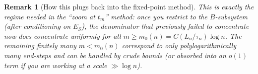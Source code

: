 \documentclass[11pt]{article}
\newtheorem{rmk}{Remark}
\begin{document}
\begin{rmk}[How this plugs back into the fixed-point method]
This is exactly the regime needed in the ``zoom at $t_m$'' method:
once you restrict to the $B$-subsystem (after conditioning on $E_S$), the denominator
that previously failed to concentrate now does concentrate uniformly for all
$m\ge m_0(n)=C(L_n/\tau_n)\log n$.
The remaining finitely many $m<m_0(n)$ correspond to only polylogarithmically many
end-steps and can be handled by crude bounds (or absorbed into an $o(1)$ term if you
are working at a scale $\gg \log n$).
\end{rmk}
\end{document}
